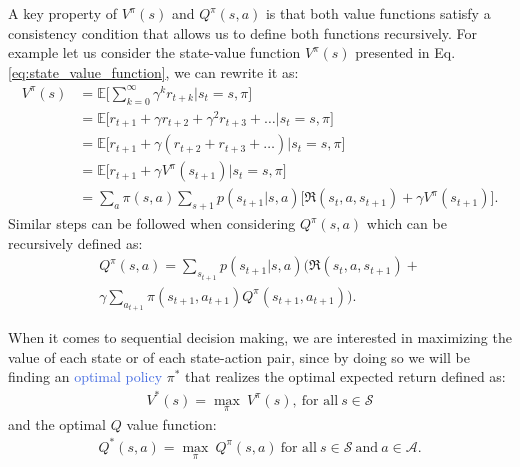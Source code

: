 A key property of $V^{\pi}(s)$ and $Q^{\pi}(s,a)$ is that both value functions satisfy a consistency condition that allows us to define both functions recursively. For example let us consider the state-value function $V^{\pi}(s)$ presented in Eq. \ref{eq:state_value_function}, we can rewrite it as:
\begin{align}
 V^{\pi}(s) & =\mathds{E}\big[\sum_{k=0}^{\infty}\gamma^{k}r_{t+k}\big| s_t = s, \pi \big] \\ 
 & =\mathds{E}\big[r_{t+1}+\gamma r_{t+2}+\gamma^{2}r_{t+3}+\ldots \big| s_t =s , \pi \big] \\ 
 & =\mathds{E}\big[r_{t+1}+\gamma(r_{t+2}+r_{t+3}+\ldots)\big| s_t =s , \pi \big] \\
 & =\mathds{E}\big[r_{t+1}+\gamma V^{\pi}(s_{t+1}) \big| s_t =s , \pi \big] \\
 & =\sum_a \pi(s,a) \sum_{s+1} p(s_{t+1}|s,a)\big[\Re(s_t, a, s_{t+1}) + \gamma V^{\pi}(s_{t+1}) \big].
\end{align}
Similar steps can be followed when considering $Q^{\pi}(s,a)$ which can be recursively defined as:
\begin{align}
	Q^{\pi}(s,a) = \sum_{s_{t+1}} p(s_{t+1}|s,a)\big(\Re(s_t, a, s_{t+1}) + \\ \gamma \sum_{a_{t+1}} \pi(s_{t+1},a_{t+1}) Q^{\pi}(s_{t+1}, a_{t+1}) \big).
\end{align}

When it comes to sequential decision making, we are interested in maximizing the value of each state or of each state-action pair, since by doing so we will be finding an \textcolor{RoyalBlue}{optimal policy} $\pi^{*}$ that realizes the optimal expected return defined as:
\begin{align}
 V^{*}(s)=\underset{\pi}{\max}\:V^{\pi}(s), \ \text{for all} \ s\in\mathcal{S}
\end{align}
and the optimal $Q$ value function:
\begin{align}
Q^{*}(s,a)= \underset{\pi}{\max}\:Q^{\pi}(s,a) \ \text{for all} \ s\in\mathcal{S} \ \text{and} \ a \in\mathcal{    A}.
\end{align}

